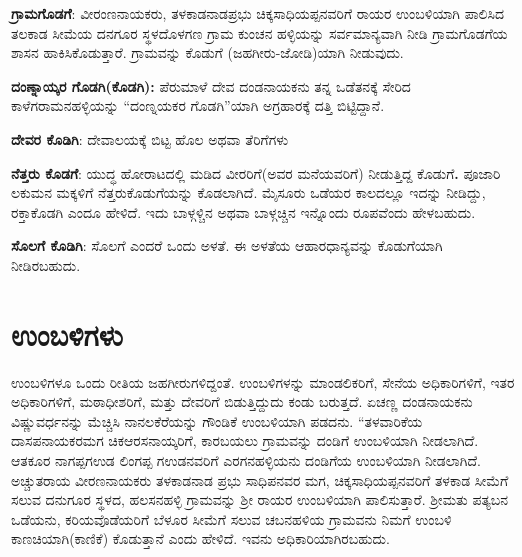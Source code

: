 \textbf{ಗ್ರಾಮಗೊಡಗೆ}: ವೀರಂಣನಾಯಕರು, ತಳಕಾಡನಾಡಪ್ರಭು ಚಿಕ್ಕಸಾಧಿಯಪ್ಪನವರಿಗೆ ರಾಯರ ಉಂಬಳಿಯಾಗಿ ಪಾಲಿಸಿದ ತಲಕಾಡ ಸೀಮೆಯ ದನಗೂರ ಸ್ಥಳದೊಳಗಣ ಗ್ರಾಮ ಕುಂಚನ ಹಳ್ಳಿಯನ್ನು ಸರ್ವಮಾನ್ಯವಾಗಿ ನೀಡಿ ಗ್ರಾಮ\-ಗೊಡಗೆಯ ಶಾಸನ ಹಾಕಿಸಿಕೊಡುತ್ತಾರೆ. ಗ್ರಾಮವನ್ನು ಕೊಡುಗೆ (ಜಹಗೀರು-ಜೋಡಿ)ಯಾಗಿ ನೀಡುವುದು.

\textbf{ದಂಣ್ನಾಯ್ಕರ ಗೊಡಗಿ(ಕೊಡಗಿ):} ಪೆರುಮಾಳೆ ದೇವ ದಂಡನಾಯಕನು ತನ್ನ ಒಡೆತನಕ್ಕೆ ಸೇರಿದ ಕಾಳೆಗರಾಮನಹಳ್ಳಿ\-ಯನ್ನು “ದಂಣ್ನಯಕರ ಗೊಡಗಿ”ಯಾಗಿ ಅಗ್ರಹಾರಕ್ಕೆ ದತ್ತಿ ಬಿಟ್ಟಿದ್ದಾನೆ.

\textbf{ದೇವರ ಕೊಡಿಗಿ}: ದೇವಾಲಯಕ್ಕೆ ಬಿಟ್ಟ ಹೊಲ ಅಥವಾ ತೆರಿಗೆಗಳು

\textbf{ನೆತ್ತರು ಕೊಡಗೆ}: ಯುದ್ಧ ಹೋರಾಟದಲ್ಲಿ ಮಡಿದ ವೀರರಿಗೆ(ಅವರ ಮನೆಯವರಿಗೆ) ನೀಡುತ್ತಿದ್ದ ಕೊಡುಗೆ\textbf{.\general{\break } }ಪೂಜಾರಿ ಲಕುಮನ ಮಕ್ಕಳಿಗೆ ನೆತ್ತರುಕೊಡುಗೆಯನ್ನು ಕೊಡಲಾಗಿದೆ. ಮೈಸೂರು ಒಡೆಯರ ಕಾಲದಲ್ಲೂ ಇದನ್ನು ನೀಡಿದ್ದು, ರಕ್ತಾಕೊಡಗಿ ಎಂದೂ ಹೇಳಿದೆ. ಇದು ಬಾಳ್ಗಳ್ಚಿನ ಅಥವಾ ಬಾಳ್ಗಚ್ಚಿನ ಇನ್ನೊಂದು ರೂಪವೆಂದು ಹೇಳಬಹುದು.

\textbf{ಸೊಲಗೆ ಕೊಡಿಗಿ}: ಸೊಲಗೆ ಎಂದರೆ ಒಂದು ಅಳತೆ. ಈ ಅಳತೆಯ ಆಹಾರಧಾನ್ಯವನ್ನು ಕೊಡುಗೆಯಾಗಿ ನೀಡಿರಬಹುದು.

\section{ಉಂಬಳಿಗಳು}

ಉಂಬಳಿಗಳೂ ಒಂದು ರೀತಿಯ ಜಹಗೀರುಗಳಿದ್ದಂತೆ. ಉಂಬಳಿಗಳನ್ನು ಮಾಂಡಲಿಕರಿಗೆ, ಸೇನೆಯ ಅಧಿಕಾರಿಗಳಿಗೆ, ಇತರ ಅಧಿಕಾರಿಗಳಿಗೆ, ಮಠಾಧೀಶರಿಗೆ, ಮತ್ತು ದೇವರಿಗೆ ಬಿಡುತ್ತಿದ್ದುದು ಕಂಡು ಬರುತ್ತದೆ. ಏಚಣ್ಣ ದಂಡನಾಯಕನು ವಿಷ್ಣುವರ್ಧನನ್ನು ಮೆಚ್ಚಿಸಿ ನಾನಲಕೆರೆಯನ್ನು ಗೌಂಡಿಕೆ ಉಂಬಳಿಯಾಗಿ ಪಡದನು. “ತಳವಾರಿಕೆಯ ದಾಸಪನಾಯಕರ\break ಮಗ ಚಿಕಆರಸನಾಯ್ಕರಿಗೆ, ಕಾರಬಯಲು ಗ್ರಾಮವನ್ನು ದಂಡಿಗೆ ಉಂಬಳಿಯಾಗಿ ನೀಡಲಾಗಿದೆ. ಆತಕೂರ ನಾಗಪ್ಪಗಉಡ ಲಿಂಗಪ್ಪ ಗಉಡನವರಿಗೆ ಎರಗನಹಳ್ಳಿಯನು ದಂಡಿಗೆಯ ಉಂಬಳಿಯಾಗಿ ನೀಡಲಾಗಿದೆ. ಅಚ್ಚುತರಾಯ ವೀರಣನಾಯಕರು ತಳಕಾಡನಾಡ ಪ್ರಭು ಸಾಧಿಪನವರ ಮಗ, ಚಿಕ್ಕಸಾಧಿಯಪ್ಪನವರಿಗೆ ತಳಕಾಡ ಸೀಮೆಗೆ ಸಲುವ ದನುಗೂರ ಸ್ಥಳದ, ಹಲಸನಹಳ್ಳಿ ಗ್ರಾಮವನ್ನು ಶ‍್ರೀ ರಾಯರ ಉಂಬಳಿಯಾಗಿ ಪಾಲಿಸುತ್ತಾರೆ. ಶ‍್ರೀಮತು ಪತ್ಯಬನ ಒಡೆಯನು, ಕರಿಯವೊಡೆಯರಿಗೆ ಬೆಳೂರ ಸೀಮೆಗೆ ಸಲುವ ಚಬನಹಳಿಯ ಗ್ರಾಮವನು ನಿಮಗೆ ಉಂಬಳಿ ಕಾಣಚಿಯಾಗಿ(ಕಾಣಿಕೆ) ಕೊಡುತ್ತಾನೆ ಎಂದು ಹೇಳಿದೆ. ಇವನು ಅಧಿಕಾರಿಯಾಗಿರಬಹುದು.

